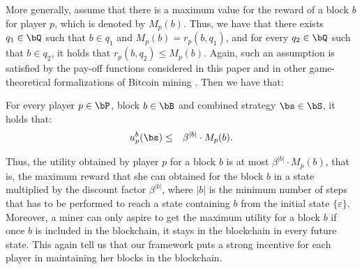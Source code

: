 More generally, assume that there is a maximum value for the reward of a block $b$ for player $p$, which is denoted by $M_p(b)$. Thus, we have that there exists $q_1 \in \bQ$ such that $b \in q_1$ and $M_p(b) = r_p(b,q_1)$, and for every $q_2 \in \bQ$ such that $b \in q_2$, it holds that $r_p(b,q_2) \leq M_p(b)$. Again, such an assumption is satisfied by the pay-off functions considered in this paper and in other game-theoretical formalizations of Bitcoin mining \cite{mininggames:2016}. Then we have that:
\begin{myprop}\label{prop-ub-block}
For every player $p \in \bP$, block $b \in \bB$ and combined strategy $\bs \in \bS$, it holds that:
\begin{eqnarray*}
u^b_p(\bs) & \leq &  \beta^{|b|} \cdot M_p(b).
\end{eqnarray*}
\end{myprop}
Thus, the utility obtained by player $p$ for a block $b$ is at most $\beta^{|b|} \cdot M_p(b)$, that is, the maximum reward that she can obtained for the block $b$ in a state multiplied by the discount factor $\beta^{|b|}$, where $|b|$ is the minimum number of steps that has to be performed to reach a state containing $b$ from the initial state $\{\varepsilon\}$. 
Moreover, a miner can only aspire to get the maximum utility for a block $b$ if once $b$ is included in the blockchain, it stays in the blockchain in every future state. This again tell us that our framework puts a strong incentive for each player in maintaining her blocks in the blockchain.




